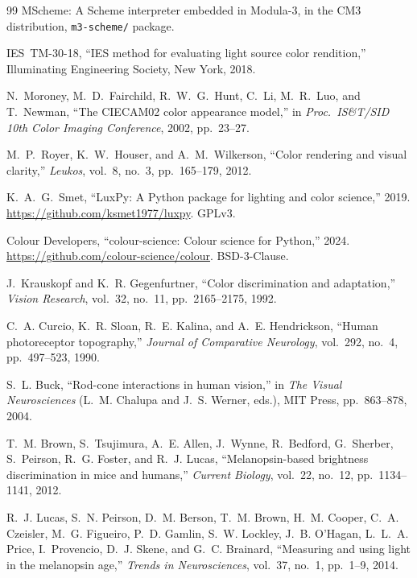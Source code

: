 \documentclass[11pt]{article}
\begin{document}
\begin{thebibliography}{99}
MScheme: A Scheme interpreter embedded in Modula-3,
in the CM3 distribution, \texttt{m3-scheme/} package.

IES~TM-30-18,
``IES method for evaluating light source color rendition,''
Illuminating Engineering Society, New York, 2018.

N.~Moroney, M.~D.~Fairchild, R.~W.~G.~Hunt, C.~Li, M.~R.~Luo, and
T.~Newman,
``The CIECAM02 color appearance model,''
in \emph{Proc.\ IS\&T/SID 10th Color Imaging Conference}, 2002,
pp.~23--27.

M.~P.~Royer, K.~W.~Houser, and A.~M.~Wilkerson,
``Color rendering and visual clarity,''
\emph{Leukos}, vol.~8, no.~3, pp.~165--179, 2012.

K.~A.~G.~Smet,
``LuxPy: A Python package for lighting and color science,''
2019. \url{https://github.com/ksmet1977/luxpy}. GPLv3.

Colour Developers,
``colour-science: Colour science for Python,''
2024. \url{https://github.com/colour-science/colour}. BSD-3-Clause.

J.~Krauskopf and K.~R. Gegenfurtner,
``Color discrimination and adaptation,''
\emph{Vision Research}, vol.~32, no.~11, pp.~2165--2175, 1992.

C.~A. Curcio, K.~R. Sloan, R.~E. Kalina, and A.~E. Hendrickson,
``Human photoreceptor topography,''
\emph{Journal of Comparative Neurology}, vol.~292, no.~4, pp.~497--523, 1990.

S.~L. Buck,
``Rod-cone interactions in human vision,''
in \emph{The Visual Neurosciences} (L.~M. Chalupa and J.~S. Werner, eds.),
MIT Press, pp.~863--878, 2004.

T.~M. Brown, S.~Tsujimura, A.~E. Allen, J.~Wynne, R.~Bedford, G.~Sherber,
S.~Peirson, R.~G. Foster, and R.~J. Lucas,
``Melanopsin-based brightness discrimination in mice and humans,''
\emph{Current Biology}, vol.~22, no.~12, pp.~1134--1141, 2012.

R.~J. Lucas, S.~N. Peirson, D.~M. Berson, T.~M. Brown, H.~M. Cooper,
C.~A. Czeisler, M.~G. Figueiro, P.~D. Gamlin, S.~W. Lockley,
J.~B. O'Hagan, L.~L.~A. Price, I.~Provencio, D.~J. Skene, and
G.~C. Brainard,
``Measuring and using light in the melanopsin age,''
\emph{Trends in Neurosciences}, vol.~37, no.~1, pp.~1--9, 2014.

\end{thebibliography}
\end{document}
